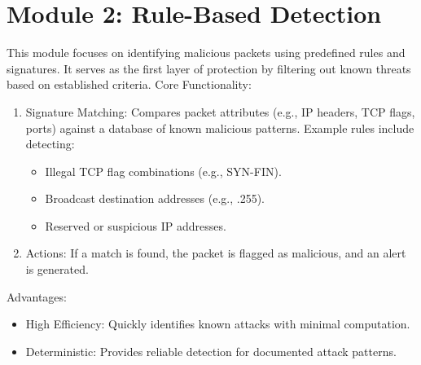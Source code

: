 \documentclass[oneside, english]{reports/assets/sdqtechreport}
\begin{document}
\section{Module 2: Rule-Based Detection}
\label{sec:RuleBasedDetection}
This module focuses on identifying malicious packets using predefined rules and signatures. It serves as the first layer of protection by filtering out known threats based on established criteria.
Core Functionality:
\begin{enumerate}
	\item Signature Matching: Compares packet attributes (e.g., IP headers, TCP flags, ports) against a database of known malicious patterns.
   	Example rules include detecting:
	\begin{itemize}
     	\item Illegal TCP flag combinations (e.g., SYN-FIN).
     	\item Broadcast destination addresses (e.g., .255).
     	\item Reserved or suspicious IP addresses.
	\end{itemize}
	\item Actions: If a match is found, the packet is flagged as malicious, and an alert is generated.
\end{enumerate}
Advantages:
\begin{itemize}
	\item High Efficiency: Quickly identifies known attacks with minimal computation.
	\item Deterministic: Provides reliable detection for documented attack patterns.
\end{itemize}
\end{document}
